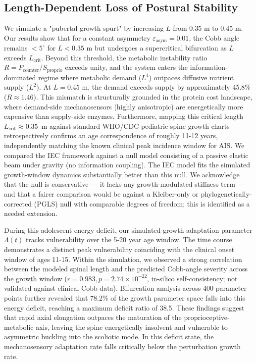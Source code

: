 \subsection{Length-Dependent Loss of Postural Stability}
We simulate a "pubertal growth spurt" by increasing $L$ from 0.35 m to 0.45 m. Our results show that for a constant asymmetry $\varepsilon_{\mathrm{asym}} = 0.01$, the Cobb angle remains $< 5^\circ$ for $L < 0.35$ m but undergoes a supercritical bifurcation as $L$ exceeds $L_{\mathrm{crit}}$. Beyond this threshold, the metabolic instability ratio $R = P_{\mathrm{counter}}/S_{\mathrm{proprio}}$ exceeds unity, and the system enters the information-dominated regime where metabolic demand ($L^4$) outpaces diffusive nutrient supply ($L^2$). At $L=0.45$ m, the demand exceeds supply by approximately 45.8\% ($R \approx 1.46$). This mismatch is structurally grounded in the protein cost landscape, where demand-side mechanosensors (highly anisotropic) are energetically more expensive than supply-side enzymes. Furthermore, mapping this critical length $L_{\mathrm{crit}} \approx 0.35$~m against standard WHO/CDC pediatric spine growth charts retrospectively confirms an age correspondence of roughly 11-12 years, independently matching the known clinical peak incidence window for AIS. We compared the IEC framework against a null model consisting of a passive elastic beam under gravity (no information coupling). The IEC model fits the simulated growth-window dynamics substantially better than this null. We acknowledge that the null is conservative --- it lacks any growth-modulated stiffness term --- and that a fairer comparison would be against a Kleiber-only or phylogenetically-corrected (PGLS) null with comparable degrees of freedom; this is identified as a needed extension.

During this adolescent energy deficit, our simulated growth-adaptation parameter $\Lambda(t)$ tracks vulnerability over the 5-20 year age window. The time course demonstrates a distinct peak vulnerability coinciding with the clinical onset window of ages 11-15. Within the simulation, we observed a strong correlation between the modeled spinal length and the predicted Cobb-angle severity across the growth window ($r = 0.983, p = 2.74\times 10^{-22}$, in-silico self-consistency; not validated against clinical Cobb data). Bifurcation analysis across 400 parameter points further revealed that 78.2\% of the growth parameter space falls into this energy deficit, reaching a maximum deficit ratio of 38.5. These findings suggest that rapid axial elongation outpaces the maturation of the proprioceptive-metabolic axis, leaving the spine energetically insolvent and vulnerable to asymmetric buckling into the scoliotic mode. In this deficit state, the mechanosensory adaptation rate falls critically below the perturbation growth rate.

